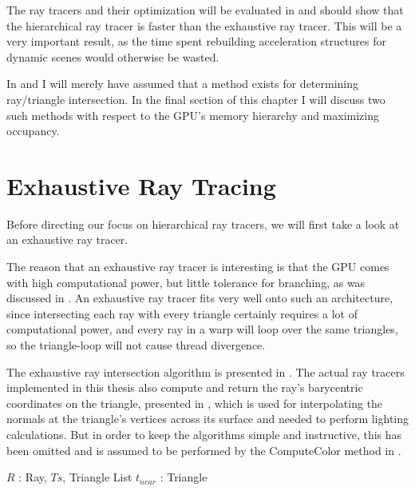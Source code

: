 The ray tracers and their optimization will be evaluated in
 and should show that the hierarchical ray tracer is
faster than the exhaustive ray tracer. This will be a very important result, as
the time spent rebuilding acceleration structures for dynamic scenes would
otherwise be wasted.

In  and  I will
merely have assumed that a method exists for determining ray/triangle
intersection. In the final section of this chapter I will discuss two such
methods with respect to the GPU's memory hierarchy and maximizing
occupancy.



\section{Exhaustive Ray Tracing} \label{sec:exhaustive}

Before directing our focus on hierarchical ray tracers, we will first
take a look at an exhaustive ray tracer.


The reason that an exhaustive ray tracer is interesting is that the GPU comes
with high computational power, but little tolerance for branching, as was
discussed in . An exhaustive ray tracer fits
very well onto such an architecture, since intersecting each ray with every
triangle certainly requires a lot of computational power, and every ray in a
warp will loop over the same triangles, so the triangle-loop will not cause
thread divergence.


The exhaustive ray intersection algorithm is presented in
. The actual ray tracers implemented in this thesis also
compute and return the ray's barycentric coordinates on the triangle, presented
in , which is used for interpolating the normals at
the triangle's vertices across its surface and needed to perform lighting
calculations. But in order to keep the algorithms simple and instructive, this
has been omitted and is assumed to be performed by the ComputeColor method in
.


\begin{algorithm}
  \caption{Exhaustive ray tracer}
  \label{alg:exhaustive}
  \begin{algorithmic}
              {$R$ : Ray, $Ts$, Triangle List}
              {$t_{near}$ : Triangle}{
                \ENDFOR
              }
  \end{algorithmic}
\end{algorithm}

